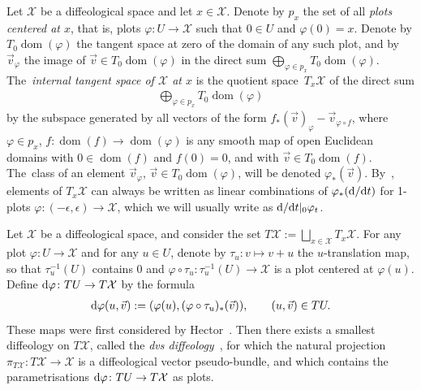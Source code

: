 \documentclass[pdftex]{sigma}
\numberwithin{equation}{section}
\def\dom{\operatorname{dom}}
\def\XX{{\mathcal{X}}}
\begin{document}
\begin{Definition}\label{tangentbundle}
Let $\XX$ be a diffeological space and let $x\in \XX$. Denote by $p_{x}$ the set of all \textit{plots centered at $x$}, that is, plots $\varphi\colon U\rightarrow \XX$ such that $0\in U$ and $\varphi(0) = x$. Denote by $T_{0}\dom(\varphi)$ the tangent space at zero of the domain of any such plot, and by $\vec{v}_{\varphi}$ the image of $\vec{v}\in T_{0}\dom(\varphi)$ in the direct sum $\bigoplus_{\varphi\in p_{x}}T_{0}\dom(\varphi)$. The~\textit{internal tangent space of $\XX$ at $x$} is the quotient space~$T_{x}\XX$ of the direct sum
\begin{gather*}
\bigoplus_{\varphi\in p_{x}} T_{0}\dom(\varphi)
\end{gather*}
by the subspace generated by all vectors of the form $f_{*}(\vec{v})_{\varphi} - \vec{v}_{\varphi\circ f}$, where $\varphi\in p_{x}$, $f\colon \dom(f)\rightarrow\dom(\varphi)$ is any smooth map of open Euclidean domains with $0\in\dom(f)$ and $f(0) = 0$, and with $\vec{v}\in T_{0}\dom(f)$. The~class of an element $\vec{v}_{\varphi}$, $\vec{v}\in T_{0}\dom(\varphi)$, will be denoted $\varphi_{*}(\vec{v})$. By~\cite[Proposition~3.3]{cw}, elements of $T_{x}\XX$ can always be written as linear combinations of $\varphi_{*}({\rm d}/{\rm d}t)$ for 1-plots $\varphi\colon (-\epsilon,\epsilon)\rightarrow\XX$, which we will usually write as ${\rm d}/{\rm d}t|_{0}\varphi_{t}$.
\end{Definition}

Let $\XX$ be a diffeological space, and consider the set $T\XX:=\bigsqcup_{x\in \XX}T_{x}\XX$. For any plot \mbox{$\varphi\colon U\rightarrow \XX$} and for any $u\in U$, denote by $\tau_{u}\colon v\mapsto v+u$ the $u$-translation map, so that $\tau_{u}^{-1}(U)$ contains $0$ and $\varphi\circ\tau_{u}\colon \tau_{u}^{-1}(U)\rightarrow \XX$ is a plot centered at $\varphi(u)$. Define ${\rm d}\varphi\colon TU\rightarrow T\XX$ by the formula
\begin{gather*}
{\rm d}\varphi(u,\vec{v}):=(\varphi(u),(\varphi\circ\tau_{u})_{*}(\vec{v})),\qquad (u,\vec{v})\in TU.
\end{gather*}
These maps were first considered by Hector~\cite{hector}. Then there exists a smallest diffeology on $T\XX$, called the \textit{dvs diffeology}~\cite{cw}, for which the natural projection $\pi_{T\XX}\colon T\XX\rightarrow \XX$ is a diffeological vector pseudo-bundle, and which contains the parametrisations ${\rm d}\varphi\colon TU\rightarrow T\XX$ as plots.
\end{document}

